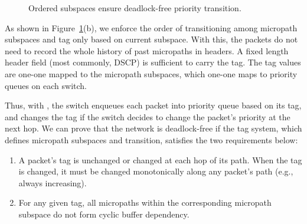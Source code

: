 \begin{figure}[t]
	\centering
	
	
	\caption{Ordered subspaces ensure deadlock-free priority transition.}\label{fig:subspace}
\end{figure}

As shown in Figure~\ref{fig:subspace}(b), we enforce the order of transitioning
among micropath subspaces and tag only based on current subspace.  With this,
the packets do not need to record the whole history of past micropaths in
headers. A fixed length header field (most commonly, DSCP) is sufficient to
carry the tag. The tag values are one-one mapped to the micropath subspaces,
which one-one maps to priority queues on each switch. 

Thus, with \sysname{}, the switch enqueues each packet into priority queue based
on its tag, and changes the tag if the switch decides to change the packet's
priority at the next hop.  We can prove that the network is deadlock-free if the
tag system, which defines micropath subspaces and transition, satisfies the two
requirements below:

\begin{enumerate}

	\item A packet's tag is unchanged or changed at each hop of its path. When the tag is changed, it must be changed monotonically 
	along any packet's path (e.g., always increasing).

	\item For any given tag, all micropaths within the corresponding micropath subspace do not form cyclic buffer dependency.

\end{enumerate}

